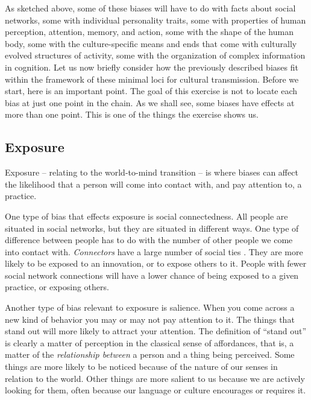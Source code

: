 As sketched above, some of these biases will have to do with facts about 
social networks, some with individual personality traits, some with 
properties of human perception, attention, memory, and action, some with 
the shape of the human body, some with the culture-specific means and 
ends that come with culturally evolved structures of activity, some with 
the organization of complex information in cognition. Let us now briefly 
consider how the previously described biases fit within 
the framework of these minimal loci for cultural transmission. Before we start, here is an important point. The goal of this exercise is not to locate each bias at just one point in the chain. As we shall see, some biases have effects at more than one point. This is one of the things the exercise shows us.


\subsection{Exposure}
Exposure -- relating to the world-to-mind transition -- is where 
biases can affect the likelihood that a person will come into contact 
with, and pay attention to, a practice.



One type of bias that effects exposure is social connectedness. All people are situated in social networks, 
but they are situated in different ways. One type of difference between 
people has to do with the number of other people we come into contact with. 
\textit{Connectors} have a large number of social ties \citep{granovetter_strength_1973}. They are more likely to be exposed to an 
innovation, or to expose others to it. People with fewer social network connections will have a 
lower chance of being exposed to a given practice, or exposing others. 



Another type of bias relevant to exposure is salience.  When you come across a new kind of behavior you may or may not pay attention to it. The things that stand out will more likely to attract your attention. The definition of ``stand out'' is 
clearly a matter of perception in the classical sense of affordances, 
that is, a matter of the \textit{relationship between} a person and a thing being perceived. 
Some things are more likely to be noticed because of the nature of our 
senses in relation to the world. Other things are more 
salient to us because we are actively looking for them, often because our 
language or culture encourages or requires it.



